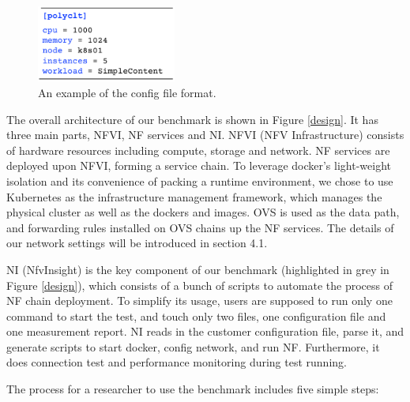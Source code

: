 \begin{figure}[!t]
\centering
\includegraphics[width=1.8in]{fig/config_file.pdf}
\caption{An example of the config file format.}
\label{config}
\end{figure}

The overall architecture of our benchmark is shown in Figure \ref{design}.
It has three main parts, NFVI, NF services and NI.
NFVI (NFV Infrastructure) consists of hardware resources
including compute, storage and network. 
NF services are deployed upon NFVI, forming a service chain. 
To leverage docker's light-weight isolation 
and its convenience of packing a runtime environment, 
we chose to use Kubernetes as the infrastructure management framework, 
which manages the physical cluster as well as the dockers and images. 
OVS is used as the data path, 
and forwarding rules installed on OVS chains up the NF services.
The details of our network settings will be introduced in section 4.1.

NI (NfvInsight) is the key component of our benchmark 
(highlighted in grey in Figure  \ref{design}), 
which consists of a bunch of scripts 
to automate the process of NF chain deployment.
To simplify its usage, 
users are supposed to run only one command to start the test,
and touch only two files, 
one configuration file and one measurement report.
NI reads in the customer configuration file, 
parse it, and generate scripts to start docker, config network, and run NF.
Furthermore, it does connection test and performance monitoring during test running.

The process for a researcher to use the benchmark includes five simple steps:

